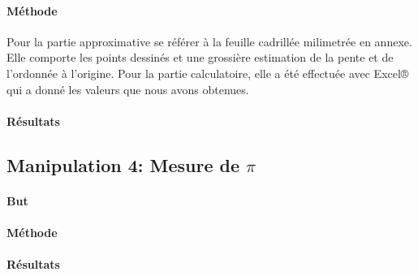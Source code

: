 \paragraph{Méthode}
Pour la partie approximative se référer à la feuille cadrillée milimetrée en annexe.
Elle comporte les points dessinés et une grossière estimation de la pente et de l'ordonnée à l'origine.
Pour la partie calculatoire, elle a été effectuée avec Excel® qui a donné les valeurs que nous avons obtenues.
\paragraph{Résultats}
\subsection{Manipulation 4: Mesure de $\pi$}
\paragraph{But}
\paragraph{Méthode}
\paragraph{Résultats}
